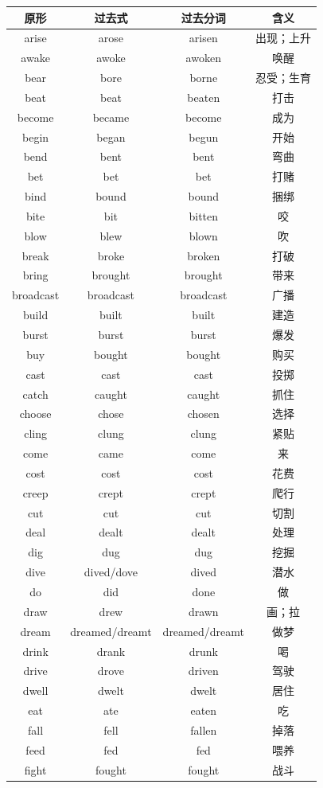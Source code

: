 \begin{center}
\begin{tabular}{c|c|c|c}
\textbf{原形} & \textbf{过去式} & \textbf{过去分词} & \textbf{含义} \\ \toprule
arise & arose & arisen & 出现；上升 \\
awake & awoke & awoken & 唤醒 \\
bear & bore & borne & 忍受；生育 \\
beat & beat & beaten & 打击 \\
become & became & become & 成为 \\
begin & began & begun & 开始 \\
bend & bent & bent & 弯曲 \\
bet & bet & bet & 打赌 \\
bind & bound & bound & 捆绑 \\
bite & bit & bitten & 咬 \\
blow & blew & blown & 吹 \\
break & broke & broken & 打破 \\
bring & brought & brought & 带来 \\
broadcast & broadcast & broadcast & 广播 \\
build & built & built & 建造 \\
burst & burst & burst & 爆发 \\
buy & bought & bought & 购买 \\
cast & cast & cast & 投掷 \\
catch & caught & caught & 抓住 \\
choose & chose & chosen & 选择 \\
cling & clung & clung & 紧贴 \\
come & came & come & 来 \\
cost & cost & cost & 花费 \\
creep & crept & crept & 爬行 \\
cut & cut & cut & 切割 \\
deal & dealt & dealt & 处理 \\
dig & dug & dug & 挖掘 \\
dive & dived/dove & dived & 潜水 \\
do & did & done & 做 \\
draw & drew & drawn & 画；拉 \\
dream & dreamed/dreamt & dreamed/dreamt & 做梦 \\
drink & drank & drunk & 喝 \\
drive & drove & driven & 驾驶 \\
dwell & dwelt & dwelt & 居住 \\
eat & ate & eaten & 吃 \\
fall & fell & fallen & 掉落 \\
feed & fed & fed & 喂养 \\
fight & fought & fought & 战斗 \\
\bottomrule
\end{tabular}
\end{center}

